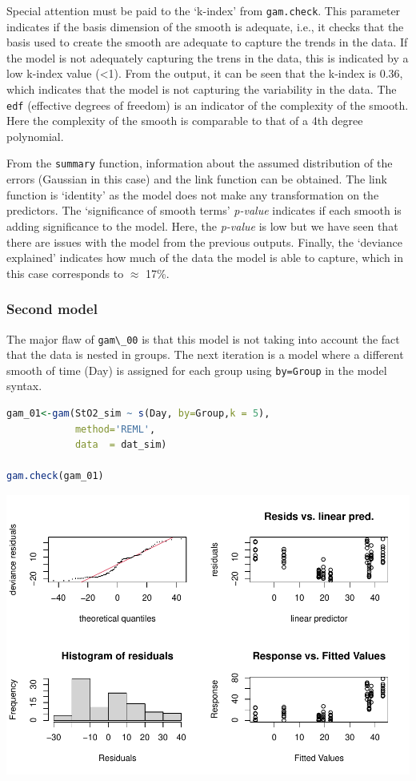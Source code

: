 \documentclass[
]{article}
\newcommand{\passthrough}[1]{#1}
\begin{document}
Special attention must be paid to the `k-index' from \passthrough{\lstinline!gam.check!}. This parameter indicates if the basis dimension of the smooth is adequate, i.e., it checks that the basis used to create the smooth are adequate to capture the trends in the data. If the model is not adequately capturing the trens in the data, this is indicated by a low k-index value (\textless1). From the output, it can be seen that the k-index is 0.36, which indicates that the model is not capturing the variability in the data. The \passthrough{\lstinline!edf!} (effective degrees of freedom) is an indicator of the complexity of the smooth. Here the complexity of the smooth is comparable to that of a 4th degree polynomial.

From the \passthrough{\lstinline!summary!} function, information about the assumed distribution of the errors (Gaussian in this case) and the link function can be obtained. The link function is `identity' as the model does not make any transformation on the predictors. The `significance of smooth terms' \emph{p-value} indicates if each smooth is adding significance to the model. Here, the \emph{p-value} is low but we have seen that there are issues with the model from the previous outputs. Finally, the `deviance explained' indicates how much of the data the model is able to capture, which in this case corresponds to \(\approx\) 17\%.

\hypertarget{second-model}{%
\subsubsection{Second model}\label{second-model}}

The major flaw of \passthrough{\lstinline!gam\_00!} is that this model is not taking into account the fact that the data is nested in groups. The next iteration is a model where a different smooth of time (Day) is assigned for each group using \passthrough{\lstinline!by=Group!} in the model syntax.

\begin{lstlisting}[language=R]
gam_01<-gam(StO2_sim ~ s(Day, by=Group,k = 5),
            method='REML',
            data  = dat_sim)

gam.check(gam_01)
\end{lstlisting}

\includegraphics{00-Full_document_files/figure-latex/second-GAM-1}
\end{document}
